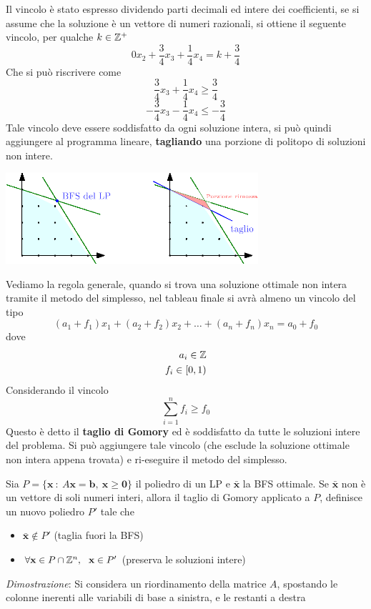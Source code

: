 \documentclass[10pt, letterpaper]{report}
\newcommand{\bb}{{\mathbf{b}}}
\newcommand{\x}{{\mathbf{x}}}
\begin{document}
Il vincolo è stato espresso dividendo parti decimali ed intere dei coefficienti, se si assume che la soluzione è un vettore di numeri razionali, si ottiene il seguente vincolo, per qualche $k\in{\mathbb Z}^+$
$$ 
0x_2+\frac{3}{4}x_3+\frac{1}{4}x_4=k+\frac{3}{4}
$$
Che si può riscrivere come 
$$ 
\frac{3}{4}x_3+\frac{1}{4}x_4\ge \frac{3}{4}
$$
$$ 
-\frac{3}{4}x_3-\frac{1}{4}x_4\le -\frac{3}{4}
$$
Tale vincolo deve essere soddisfatto da ogni soluzione intera, si può quindi aggiungere al programma lineare, \textbf{tagliando} una porzione di politopo di soluzioni non intere.
\begin{center}
    \includegraphics[width=0.7\textwidth ]{images/gomorycut.eps}
\end{center}
Vediamo la regola generale, quando si trova una soluzione ottimale non intera tramite il metodo del simplesso, nel tableau finale si avrà almeno un vincolo del tipo
$$ 
(a_1+f_1)x_1+(a_2+f_2)x_2+\dots+(a_n+f_n)x_n = a_0+f_0
$$
dove 
\begin{eqnarray*}
    a_i\in{\mathbb Z}\\ f_i \in [0,1)
\end{eqnarray*}
Considerando il vincolo 
$$ \sum_{i=1}^nf_i\ge f_0$$
Questo è detto il \textbf{taglio di Gomory} ed è soddisfatto da tutte le soluzioni intere del problema. Si può aggiungere tale vincolo (che esclude la soluzione ottimale non intera appena trovata) e ri-eseguire il metodo del simplesso.
\begin{teorema}
    Sia $P=\{\x \ : \ A\x=\bb, \ \x\ge\mathbf 0\}$ il poliedro di un LP e $\bar\x$ la BFS ottimale. Se $\bar \x$ non è un vettore di soli numeri interi, allora il taglio di Gomory applicato a $P$, definisce un nuovo poliedro $P'$ tale che \begin{itemize}
        \item $\bar\x\notin P'$ (taglia fuori la BFS)
        \item $\forall \x \in P\cap \Z^n, \ \ \x\in P'$ (preserva le soluzioni intere)
    \end{itemize}
\end{teorema}
\textit{Dimostrazione}: 
Si considera un riordinamento della matrice $A$, spostando le colonne inerenti alle variabili di base a sinistra, e le restanti a destra 
\end{document}

